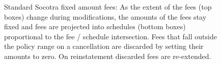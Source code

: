 \begin{figure}[h]
  \caption{
    Standard Socotra fixed amount fees: As the extent of the fees (top boxes) change during modifications, the
    amounts of the fees stay fixed and fees are projected into schedules (bottom boxes) proportional to
    the fee / schedule intersection. Fees that fall outside the policy range on a
    cancellation are discarded by setting their amounts to zero. On reinstatement discarded fees are
    re-extended.
  }
  \label{fig:3:2}
\end{figure}
